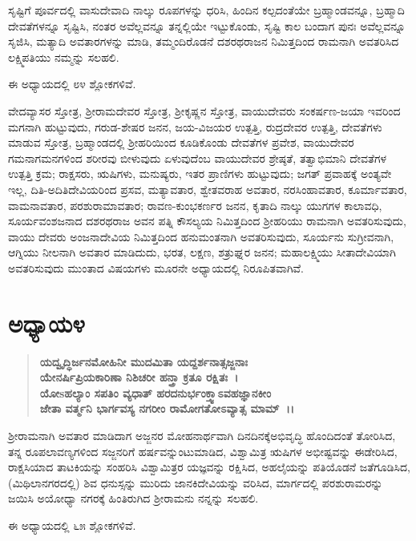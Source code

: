 ಸೃಷ್ಟಿಗೆ ಪೂರ್ವದಲ್ಲಿ ವಾಸುದೇವಾದಿ ನಾಲ್ಕು ರೂಪಗಳನ್ನು ಧರಿಸಿ, ಹಿಂದಿನ ಕಲ್ಪದಂತೆಯೇ ಬ್ರಹ್ಮಾಂಡವನ್ನೂ, ಬ್ರಹ್ಮಾದಿ ದೇವತೆಗಳನ್ನೂ ಸೃಷ್ಟಿಸಿ, ನಂತರ ಅವೆಲ್ಲವನ್ನೂ ತನ್ನಲ್ಲಿಯೇ ಇಟ್ಟುಕೊಂಡು, ಸೃಷ್ಟಿ ಕಾಲ ಬಂದಾಗ ಪುನಃ ಅವೆಲ್ಲವನ್ನೂ ಸೃಜಿಸಿ, ಮತ್ಯಾದಿ ಅವತಾರಗಳನ್ನು ಮಾಡಿ, ತಮ್ಮಂದಿರೊಡನೆ ದಶರಥರಾಜನ ನಿಮಿತ್ತದಿಂದ ರಾಮನಾಗಿ ಅವತರಿಸಿದ ಲಕ್ಷ್ಮಿಪತಿಯು ನಮ್ಮನ್ನು ಸಲಹಲಿ.

ಈ ಅಧ್ಯಾಯದಲ್ಲಿ ೮೪ ಶ್ಲೋಕಗಳಿವೆ.

ವೇದವ್ಯಾಸರ ಸ್ತೋತ್ರ, ಶ‍್ರೀರಾಮದೇವರ ಸ್ತೋತ್ರ, ಶ‍್ರೀಕೃಷ್ಣನ ಸ್ತೋತ್ರ, ವಾಯುದೇವರು ಸಂಕರ್ಷಣ-ಜಯಾ ಇವರಿಂದ ಮಗನಾಗಿ ಹುಟ್ಟುವುದು, ಗರುಡ-ಶೇಷರ ಜನನ, ಜಯ-ವಿಜಯರ ಉತ್ಪತ್ತಿ, ರುದ್ರದೇವರ ಉತ್ಪತ್ತಿ, ದೇವತೆಗಳು ಮಾಡುವ ಸ್ತೋತ್ರ, ಬ್ರಹ್ಮಾಂಡದಲ್ಲಿ ಶ‍್ರೀಹರಿಯಿಂದ ಕೂಡಿಕೊಂಡು ದೇವತೆಗಳ ಪ್ರವೇಶ, ವಾಯುದೇವರ ಗಮನಾಗಮನಗಳಿಂದ ಶರೀರವು ಬೀಳುವುದು ಏಳುವುದೆಂಬ ವಾಯುದೇವರ ಶ್ರೇಷ್ಠತೆ, ತತ್ವಾಭಿಮಾನಿ ದೇವತೆಗಳ ಉತ್ಪತ್ತಿ ಕ್ರಮ; ರಾಕ್ಷಸರು, ಋಷಿಗಳು, ಮನುಷ್ಯರು, ಇತರ ಪ್ರಾಣಿಗಳು ಹುಟ್ಟುವುದು; ಜಗತ್ ಪ್ರವಾಹಕ್ಕೆ ಅಂತ್ಯವೇ ಇಲ್ಲ, ದಿತಿ-ಅದಿತಿದೇವಿಯರಿಂದ ಪ್ರಸವ, ಮತ್ಯಾವತಾರ, ಶ್ವೇತವರಾಹ ಅವತಾರ, ನರಸಿಂಹಾವತಾರ, ಕೂರ್ಮಾವತಾರ, ವಾಮನಾವತಾರ, ಪರಶುರಾಮಾವತಾರ; ರಾವಣ-ಕುಂಭಕರ್ಣರ ಜನನ, ಕೃತಾದಿ ನಾಲ್ಕು ಯುಗಗಳ ಕಾಲಾವಧಿ, ಸೂರ್ಯವಂಶಜನಾದ ದಶರಥರಾಜ ಅವನ ಪತ್ನಿ ಕೌಸಲ್ಯಯ ನಿಮಿತ್ತದಿಂದ ಶ‍್ರೀಹರಿಯು ರಾಮನಾಗಿ ಅವತರಿಸುವುದು, ವಾಯು ದೇವರು ಅಂಜನಾದೇವಿಯ ನಿಮಿತ್ತದಿಂದ ಹನುಮಂತನಾಗಿ ಅವತರಿಸುವುದು, ಸೂರ್ಯನು ಸುಗ್ರೀವನಾಗಿ, ಆಗ್ನಿಯು ನೀಲನಾಗಿ ಅವತಾರ ಮಾಡಿದುದು, ಭರತ, ಲಕ್ಷಣ, ಶತ್ರುಘ್ನರ ಜನನ; ಮಹಾಲಕ್ಷ್ಮಿಯು ಸೀತಾದೇವಿಯಾಗಿ ಅವತರಿಸುವುದು ಮುಂತಾದ ವಿಷಯಗಳು ಮೂರನೇ ಅಧ್ಯಾಯದಲ್ಲಿ ನಿರೂಪಿತವಾಗಿವೆ.


\section*{ಅಧ್ಯಾಯ\enginline{-}೪}

\begin{verse}
\textbf{ಯದ್ವೃದ್ಧಿರ್ಜನಮೋಹಿನೀ ಮುದಮಿತಾ ಯದ್ದರ್ಶನಾತ್ಸಜ್ಜನಾಃ}\\\textbf{ಯೇನರ್ಷಿಪ್ರಿಯಕಾರಿಣಾ ನಿಶಿಚರೀ ಹನ್ತ್ರಾ ಕ್ರತೂ ರಕ್ಷಿತಃ~।}\\\textbf{ಯೋsಹಲ್ಯಾಂ ಸಪತಿಂ ವ್ಯಧಾತ್‌ ಹರದನುರ್ಭಂಕ್ತ್ವಾಽವಹಜ್ಞಾನಕೀಂ}\\\textbf{ಜೇತಾ ವರ್ತ್ಮನಿ ಭಾರ್ಗವಸ್ಯ ನಗರೀಂ ರಾಮೋಗತೋಽವ್ಯಾತ್ಸ ಮಾಮ್~।।}
\end{verse}

ಶ‍್ರೀರಾಮನಾಗಿ ಅವತಾರ ಮಾಡಿದಾಗ ಅಜ್ಜನರ ಮೋಹನಾರ್ಥವಾಗಿ ದಿನದಿನಕ್ಕೆ\break ಅಭಿವೃದ್ಧಿ ಹೊಂದಿದಂತೆ ತೋರಿಸಿದ, ತನ್ನ ರೂಪಲಾವಣ್ಯಗಳಿಂದ ಸಜ್ಜನರಿಗೆ ಹರ್ಷವನ್ನುಂಟುಮಾಡಿದ, ವಿಶ್ವಾಮಿತ್ರ ಋಷಿಗಳ ಅಭೀಷ್ಟವನ್ನು ಈಡೇರಿಸಿದ, ರಾಕ್ಷಸಿಯಾದ ತಾಟಕಿಯನ್ನು ಸಂಹರಿಸಿ ವಿಶ್ವಾಮಿತ್ರರ ಯಜ್ಞವನ್ನು ರಕ್ಷಿಸಿದ, ಅಹಲೈಯನ್ನು ಪತಿಯೊಡನೆ ಜತೆಗೂಡಿಸಿದ, (ಮಿಥಿಲಾನಗರದಲ್ಲಿ) ಶಿವ ಧನುಸ್ಸನ್ನು ಮುರಿದು ಜಾನಕಿದೇವಿಯನ್ನು ವರಿಸಿದ, ಮಾರ್ಗದಲ್ಲಿ ಪರಶುರಾಮರನ್ನು ಜಯಿಸಿ ಅಯೋಧ್ಯಾ ನಗರಕ್ಕೆ ಹಿಂತಿರುಗಿದ ಶ‍್ರೀರಾಮನು ನನ್ನನ್ನು ಸಲಹಲಿ.

ಈ ಅಧ್ಯಾಯದಲ್ಲಿ ೬೫ ಶ್ಲೋಕಗಳಿವೆ.

